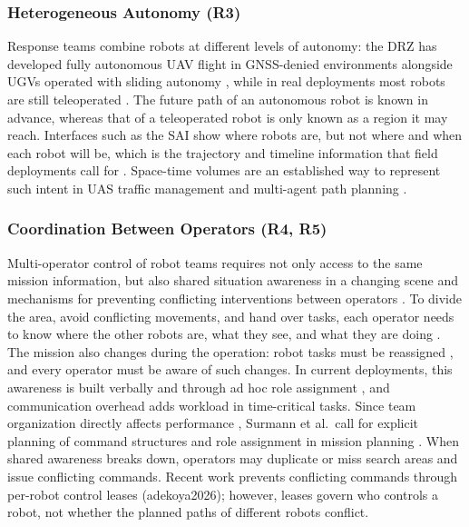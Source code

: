 \documentclass{article}
\begin{document}
\subsubsection{Heterogeneous Autonomy (R3)}
Response teams combine robots at different levels of autonomy: the DRZ has developed fully autonomous UAV flight in GNSS-denied environments alongside UGVs operated with sliding autonomy \cite{kruijff2021}, while in real deployments most robots are still teleoperated \cite{surmann2024}.
The future path of an autonomous robot is known in advance, whereas that of a teleoperated robot is only known as a region it may reach.
Interfaces such as the SAI show where robots are, but not where and when each robot will be, which is the trajectory and timeline information that field deployments call for \cite{surmann2024}.
Space-time volumes are an established way to represent such intent in UAS traffic management \cite{astmf3548} and multi-agent path planning \cite{silver2005}.

\subsubsection{Coordination Between Operators (R4, R5)}
Multi-operator control of robot teams requires not only access to the same mission information, but also shared situation awareness in a changing scene \cite{endsley2001team} and mechanisms for preventing conflicting interventions between operators \cite{music2017control}.
To divide the area, avoid conflicting movements, and hand over tasks, each operator needs to know where the other robots are, what they see, and what they are doing \cite{gutwin2002workspace, drury2003awareness}.
The mission also changes during the operation: robot tasks must be reassigned \cite{kruijff2021}, and every operator must be aware of such changes.
In current deployments, this awareness is built verbally and through ad hoc role assignment \cite{burke2004, surmann2024}, and communication overhead adds workload in time-critical tasks.
Since team organization directly affects performance \cite{lewis2010teams}, Surmann et al.\ call for explicit planning of command structures and role assignment in mission planning \cite{surmann2024}.
When shared awareness breaks down, operators may duplicate or miss search areas and issue conflicting commands.
Recent work prevents conflicting commands through per-robot control leases (adekoya2026); however, leases govern who controls a robot, not whether the planned paths of different robots conflict.
\end{document}
